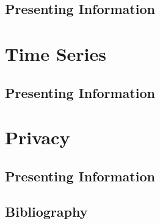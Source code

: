 \documentclass[11pt,fleqn]{book} %
\begin{document}

\chapter{Presenting Information}

%


\part{Time Series}


\chapter{Presenting Information}

%


\part{Privacy}


\chapter{Presenting Information}

%


\chapter*{Bibliography}

\end{document}
